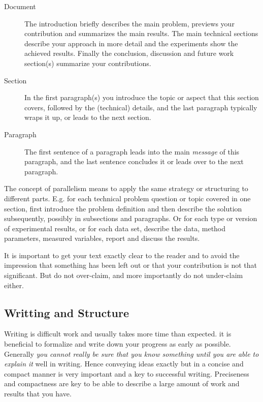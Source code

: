 \documentclass[11pt, a4paper,oneside,chapterprefix=false]{scrbook}
\begin{document}
\begin{description}
\item[Document] The introduction briefly describes the main problem, previews your contribution and summarizes the main results. The main technical sections describe your approach in more detail and the experiments show the achieved results. Finally the conclusion, discussion and future work section(s) summarize your contributions.
\item[Section] In the first paragraph(s) you introduce the topic or aspect that this section covers, followed by the (technical) details, and the last paragraph typically wraps it up, or leads to the next section.
\item[Paragraph] The first sentence of a paragraph leads into the main \emph{message} of this paragraph, and the last sentence concludes it or leads over to the next paragraph.
\end{description}

The concept of parallelism means to apply the same strategy or structuring to different parts. E.g. for each technical problem question or topic covered in one section, first introduce the problem definition and then describe the solution subsequently, possibly in subsections and paragraphs. Or for each type or version of experimental results, or for each data set, describe the data, method parameters, measured variables, report and discuss the results.

It is important to get your text exactly clear to the reader and to avoid the impression that something has been left out or that your contribution is not that significant. But do not over-claim, and more importantly do not under-claim either.

\subsection*{Writting and Structure}

Writing is difficult work and usually takes more time than expected. it is beneficial to formalize and write down your progress as early as possible. Generally \emph{you cannot really be sure that you know something until you are able to explain it} well in writing. Hence conveying ideas exactly but in a concise and compact manner is very important and a key to successful writing. Preciseness and compactness are key to be able to describe a large amount of work and results that you have.
\end{document}

